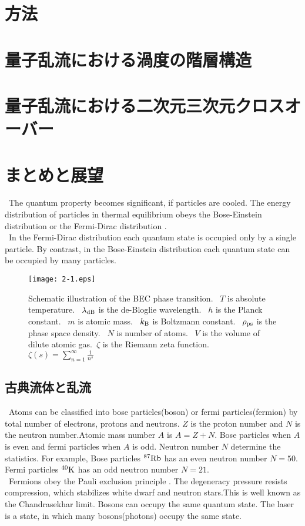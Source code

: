 \documentclass[12pt,a4paper]{jbook}
\newcommand{\kb} {k_{\rm B}}				           %
\begin{document}
\chapter{方法}

\chapter{量子乱流における渦度の階層構造}

\chapter{量子乱流における二次元三次元クロスオーバー}

\chapter{まとめと展望}

\ The quantum property becomes significant, if particles are cooled.
The energy distribution of particles in thermal equilibrium obeys
the Bose-Einstein distribution or the Fermi-Dirac distribution \cite{13}\cite{14}.
\\
\ In the Fermi-Dirac distribution each quantum state is occupied only by a single particle.
By contrast, in the Bose-Einstein distribution each quantum state can be occupied by many particles.
\begin{figure}[htbp]
\begin{center}
\texttt{[image: 2-1.eps]}
\caption{
Schematic illustration of the BEC phase transition. \ $T$ is absolute temperature.
\ ${\lambda_{\rm dB}}$ is the de-Bloglie wavelength. \ $h$ is the Planck constant.
\ $m$ is atomic mass.
\ $\kb$ is Boltzmann constant. \ $\rho_{{\rm ps}}$ is the phase space density.
\ $N$ is number of atoms. \ $V$ is the volume of dilute atomic gas.\ $\zeta$ is the Riemann zeta function.
$\zeta(s)=\sum_{n=1}^\infty \frac{1}{n^s}$
}
\label{FIG:2-1}
\end{center}
\end{figure}

\section{古典流体と乱流}
\ Atoms can be classified into bose particles(boson) or fermi particles(fermion)
by total number of electrons, protons and neutrons.
$Z$ is the proton number and $N$ is the neutron number.Atomic mass number $A$ is
$A = Z + N$. Bose particles when $A$ is even and fermi particles when $A$ is odd.
Neutron number $N$ determine the statistics.
For example, Bose particles ${\rm ^{87}Rb}$ has an even neutron number $N = 50$.
Fermi particles ${\rm ^{40}K}$ has an odd neutron number $N = 21$.
\\
\ Fermions obey the Pauli exclusion principle \cite{15}.
The degeneracy pressure resists compression, which stabilizes white dwarf
and neutron stars.This is well known as the Chandrasekhar limit.
Bosons can occupy the same quantum state. The laser is a state, in which many bosons(photons)
occupy the same state.
\end{document}
